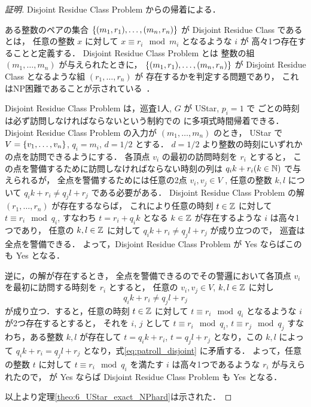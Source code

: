 \begin{proof}[証明]
	Disjoint Residue Class Problem からの帰着による．

	ある整数のペアの集合 $\left\{{ (m_1, r_1), \ldots, (m_n, r_n) }\right\}$ が
	Disjoint Residue Class であるとは，
	任意の整数 $x$ に対して $x \equiv r_i \mod m_i$ となるような $i$ が
	高々1つ存在することと定義する．
	Disjoint Residue Class Problem とは
	整数の組 $(m_1, \ldots, m_n)$ が与えられたときに，
	$\left\{{ (m_1, r_1), \ldots, (m_n, r_n) }\right\}$ が
	Disjoint Residue Class となるような組 $(r_1, \ldots, r_n)$ が
	存在するかを判定する問題であり，
	これはNP困難であることが示されている~\cite{kawamura2015simple}．

	Disjoint Residue Class Problem は，巡査1人, $G$ が UStar, $p_i = 1$ で
	{\period}ごとの時刻は必ず訪問しなければならないという制約での \decisionpp に多項式時間帰着できる．
	Disjoint Residue Class Problem の入力が $(m_1, \ldots, m_n)$ のとき，
	UStar で $V = \left\{{ v_1, \ldots, v_n }\right\}$, $q_i = m_i$, $d = 1/2$ とする．
	$d = 1/2$ より整数の時刻にいずれかの点を訪問できるようにする．
	各頂点 $v_i$ の最初の訪問時刻を $r_i$ とすると，
	この点を警備するために訪問しなければならない時刻の列は
	$q_i k + r_i (k \in \mathbb{N})$ で与えられるが，
	全点を警備するためには任意の2点 $v_i, v_j \in V$ , 任意の整数 $k,l$ について
	$q_i k + r_i \neq q_j l + r_j$
	である必要がある．
	Disjoint Residue Class Problem の解 $(r_1, \ldots, r_n)$ が存在するならば，
	これにより任意の時刻 $t \in \mathbb{Z}$ に対して $t \equiv r_i \mod q_i$, 
	すなわち $t = r_i + q_i k$ となる $k \in \mathbb{Z}$ が存在するような $i$ は高々1つであり，
	任意の $k,l \in \mathbb{Z}$ に対して $q_i k + r_i \neq q_j l + r_j$ が成り立つので，
	巡査は全点を警備できる．
	よって，Disjoint Residue Class Problem が Yes ならばこの \decisionpp も Yes となる．

	逆に，\decisionpp の解が存在するとき，
	全点を警備できるのでその警邏において各頂点 $v_i$ を最初に訪問する時刻を $r_i$ とすると，
	任意の $v_i,v_j \in V$, $k,l \in \mathbb{Z}$ に対し
	\begin{equation}
		\label{eq:patroll_disjoint}
		q_i k + r_i \neq q_j l + r_j
	\end{equation}
	が成り立つ．すると，任意の時刻 $t \in \mathbb{Z}$ に対して
	$t \equiv r_i \mod q_i$ となるような $i$ が2つ存在するとすると，
	それを $i$, $j$ として
	$t \equiv r_i \mod q_i$, $t \equiv r_j \mod q_j$
	すなわち，ある整数 $k,l$ が存在して
	$t = q_i k + r_i$, $t = q_j l + r_j$
	となり，この $k,l$ によって
	$q_i k + r_i = q_j l + r_j$ となり，式\ref{eq:patroll_disjoint} に矛盾する．
	よって，任意の整数 $t$ に対して $t \equiv r_i \mod q_i$ を満たす
	$i$ は高々1つであるような $r_i$ が与えられたので，
	\decisionpp が Yes ならば Disjoint Residue Class Problem も Yes となる．

	以上より定理\ref{theo:6_UStar_exact_NPhard}は示された．
\end{proof}


